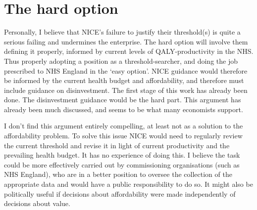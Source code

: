 \section{The hard option}
Personally, I believe that NICE's failure to justify their threshold(s) is quite a serious failing and undermines the enterprise. The hard option will involve them defining it properly, informed by current levels of QALY-productivity in the NHS. Thus properly adopting a position as a threshold-searcher\cite{Culyer_2007}, and doing the job prescribed to NHS England in the `easy option'. NICE guidance would therefore be informed by the current health budget and affordability, and therefore must include guidance on disinvestment. The first stage of this work has already been done\cite{claxton2013methods}. The disinvestment guidance would be the hard part. This argument has already been much discussed, and seems to be what many economists support\cite{Claxton_2014,Raftery_2009,McCabe_2008}.

I don't find this argument entirely compelling, at least not as a solution to the affordability problem. To solve this issue NICE would need to regularly review the current threshold and revise it in light of current productivity and the prevailing health budget. It has no experience of doing this. I believe the task could be more effectively carried out by commissioning organisations (such as NHS England), who are in a better position to oversee the collection of the appropriate data and would have a public responsibility to do so. It might also be politically useful if decisions about affordability were made independently of decisions about value.